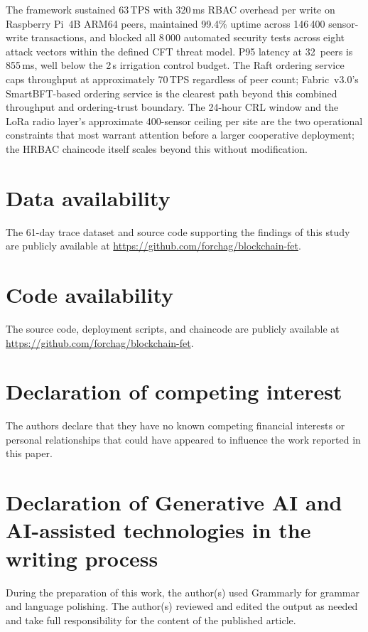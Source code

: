 \documentclass[a4paper,fleqn]{cas-dc}
\begin{document}
The framework sustained 63\,TPS with 320\,ms RBAC overhead per write on
Raspberry Pi~4B ARM64 peers, maintained 99.4\% uptime across 146\,400
sensor-write transactions, and blocked all 8\,000 automated security
tests across eight attack vectors within the defined CFT threat model.
P95 latency at 32~peers is 855\,ms, well below the 2\,s irrigation
control budget. The Raft ordering service caps throughput at
approximately 70\,TPS regardless of peer count; Fabric~v3.0's
SmartBFT-based ordering service is the clearest path beyond this
combined throughput and ordering-trust boundary. The 24-hour CRL window
and the LoRa radio layer's approximate 400-sensor ceiling per site are
the two operational constraints that most warrant attention before a
larger cooperative deployment; the HRBAC chaincode itself scales beyond
this without modification.

\section*{Data availability}

The 61-day trace dataset and source code supporting
the findings of this study are publicly available at
\url{https://github.com/forchag/blockchain-fet}.

\section*{Code availability}

The source code, deployment scripts, and chaincode are publicly
available at \url{https://github.com/forchag/blockchain-fet}.

\section*{Declaration of competing interest}

The authors declare that they have no known competing financial
interests or personal relationships that could have appeared to influence
the work reported in this paper.

\section*{Declaration of Generative AI and AI-assisted technologies in the
writing process}

During the preparation of this work, the author(s) used Grammarly for
grammar and language polishing. The author(s) reviewed and edited the
output as needed and take full responsibility for the content of the
published article.
\end{document}
